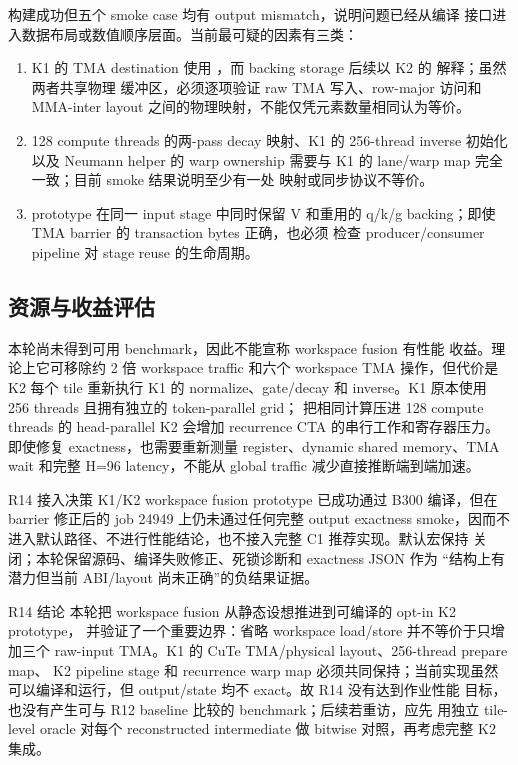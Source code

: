 构建成功但五个 smoke case 均有 output mismatch，说明问题已经从编译
接口进入数据布局或数值顺序层面。当前最可疑的因素有三类：

\begin{enumerate}
  \item K1 的 TMA destination 使用 ，而 backing
        storage 后续以 K2 的  解释；虽然两者共享物理
        缓冲区，必须逐项验证 raw TMA 写入、row-major 访问和 MMA-inter
        layout 之间的物理映射，不能仅凭元素数量相同认为等价。
  \item 128 compute threads 的两-pass decay 映射、K1 的 256-thread
        inverse 初始化以及 Neumann helper 的 warp ownership 需要与
        K1 的 lane/warp map 完全一致；目前 smoke 结果说明至少有一处
        映射或同步协议不等价。
  \item prototype 在同一 input stage 中同时保留 V 和重用的 q/k/g
        backing；即使 TMA barrier 的 transaction bytes 正确，也必须
        检查 producer/consumer pipeline 对 stage reuse 的生命周期。
\end{enumerate}

\subsection{资源与收益评估}

本轮尚未得到可用 benchmark，因此不能宣称 workspace fusion 有性能
收益。理论上它可移除约 2 倍 workspace traffic 和六个 workspace TMA
操作，但代价是 K2 每个 tile 重新执行 K1 的 normalize、gate/decay 和
inverse。K1 原本使用 256 threads 且拥有独立的 token-parallel grid；
把相同计算压进 128 compute threads 的 head-parallel K2 会增加 recurrence
CTA 的串行工作和寄存器压力。即使修复 exactness，也需要重新测量
register、dynamic shared memory、TMA wait 和完整 H=96 latency，不能从
global traffic 减少直接推断端到端加速。

\begin{decision}{R14 接入决策}
K1/K2 workspace fusion prototype 已成功通过 B300 编译，但在 barrier
修正后的 job 24949 上仍未通过任何完整 output exactness smoke，因而不
进入默认路径、不进行性能结论，也不接入完整 C1 推荐实现。默认宏保持
关闭；本轮保留源码、编译失败修正、死锁诊断和 exactness JSON 作为
“结构上有潜力但当前 ABI/layout 尚未正确”的负结果证据。
\end{decision}

\begin{record}{R14 结论}
本轮把 workspace fusion 从静态设想推进到可编译的 opt-in K2 prototype，
并验证了一个重要边界：省略 workspace load/store 并不等价于只增加三个
raw-input TMA。K1 的 CuTe TMA/physical layout、256-thread prepare map、
K2 pipeline stage 和 recurrence warp map 必须共同保持；当前实现虽然
可以编译和运行，但 output/state 均不 exact。故 R14 没有达到作业性能
目标，也没有产生可与 R12 baseline 比较的 benchmark；后续若重访，应先
用独立 tile-level oracle 对每个 reconstructed intermediate 做 bitwise
对照，再考虑完整 K2 集成。
\end{record}
